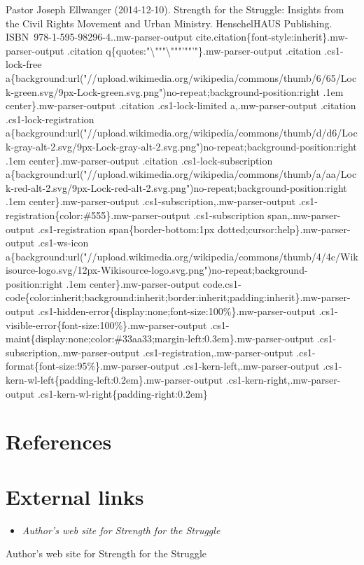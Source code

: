 Pastor Joseph Ellwanger (2014-12-10). Strength for the Struggle:
Insights from the Civil Rights Movement and Urban Ministry. HenschelHAUS
Publishing. ISBN~978-1-595-98296-4..mw-parser-output
cite.citation\{font-style:inherit\}.mw-parser-output .citation
q\{quotes:"\textbackslash{}"""\textbackslash{}"""'""'"\}.mw-parser-output
.citation .cs1-lock-free
a\{background:url("//upload.wikimedia.org/wikipedia/commons/thumb/6/65/Lock-green.svg/9px-Lock-green.svg.png")no-repeat;background-position:right
.1em center\}.mw-parser-output .citation .cs1-lock-limited
a,.mw-parser-output .citation .cs1-lock-registration
a\{background:url("//upload.wikimedia.org/wikipedia/commons/thumb/d/d6/Lock-gray-alt-2.svg/9px-Lock-gray-alt-2.svg.png")no-repeat;background-position:right
.1em center\}.mw-parser-output .citation .cs1-lock-subscription
a\{background:url("//upload.wikimedia.org/wikipedia/commons/thumb/a/aa/Lock-red-alt-2.svg/9px-Lock-red-alt-2.svg.png")no-repeat;background-position:right
.1em center\}.mw-parser-output .cs1-subscription,.mw-parser-output
.cs1-registration\{color:\#555\}.mw-parser-output .cs1-subscription
span,.mw-parser-output .cs1-registration span\{border-bottom:1px
dotted;cursor:help\}.mw-parser-output .cs1-ws-icon
a\{background:url("//upload.wikimedia.org/wikipedia/commons/thumb/4/4c/Wikisource-logo.svg/12px-Wikisource-logo.svg.png")no-repeat;background-position:right
.1em center\}.mw-parser-output
code.cs1-code\{color:inherit;background:inherit;border:inherit;padding:inherit\}.mw-parser-output
.cs1-hidden-error\{display:none;font-size:100\%\}.mw-parser-output
.cs1-visible-error\{font-size:100\%\}.mw-parser-output
.cs1-maint\{display:none;color:\#33aa33;margin-left:0.3em\}.mw-parser-output
.cs1-subscription,.mw-parser-output .cs1-registration,.mw-parser-output
.cs1-format\{font-size:95\%\}.mw-parser-output
.cs1-kern-left,.mw-parser-output
.cs1-kern-wl-left\{padding-left:0.2em\}.mw-parser-output
.cs1-kern-right,.mw-parser-output
.cs1-kern-wl-right\{padding-right:0.2em\}

\section{References}\label{references}

\section{External links}\label{external-links}

\begin{itemize}
\item
  \emph{Author's web site for Strength for the Struggle}
\end{itemize}

Author's web site for Strength for the Struggle
